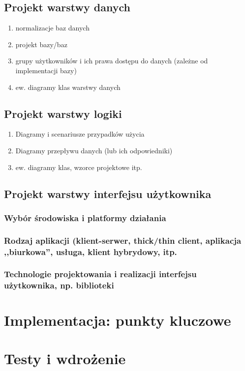 \documentclass[12pt]{report}
\begin{document}
\subsection{Projekt warstwy danych}

\begin{enumerate}
\item normalizacje baz danych
\item projekt bazy/baz 
\item grupy użytkowników i ich prawa dostępu do danych (zależne od implementacji bazy)
\item ew. diagramy klas warstwy danych
\end{enumerate}
\subsection{Projekt warstwy logiki}
\begin{enumerate}
\item Diagramy i scenariusze przypadków użycia
\item Diagramy przepływu danych (lub ich odpowiedniki)
\item ew. diagramy klas, wzorce projektowe itp.
\end{enumerate}

\subsection{Projekt warstwy interfejsu użytkownika}
\subsubsection{Wybór środowiska i platformy działania}
\subsubsection{Rodzaj aplikacji (klient-serwer, thick/thin client, aplikacja
,,biurkowa'', usługa, klient hybrydowy, itp.}
\subsubsection{Technologie projektowania i realizacji interfejsu użytkownika,
np. biblioteki}


\section{Implementacja: punkty kluczowe}

\section{Testy i wdrożenie}
\end{document}
